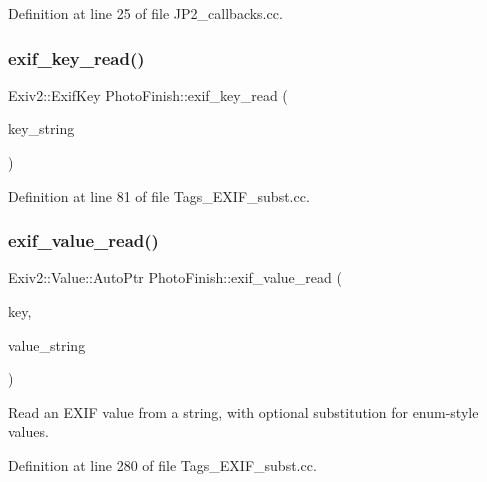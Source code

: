 Definition at line 25 of file J\+P2\+\_\+callbacks.\+cc.

\mbox{\label{namespace_photo_finish_a0b89b01a1b60b5e7c02fa92d001d9872}} 
\subsubsection{\texorpdfstring{exif\+\_\+key\+\_\+read()}{exif\_key\_read()}}
{\footnotesize\ttfamily Exiv2\+::\+Exif\+Key Photo\+Finish\+::exif\+\_\+key\+\_\+read (\begin{DoxyParamCaption}\item[{std\+::string}]{key\+\_\+string }\end{DoxyParamCaption})}



Definition at line 81 of file Tags\+\_\+\+E\+X\+I\+F\+\_\+subst.\+cc.

\mbox{\label{namespace_photo_finish_a26b48907e51881629189963d62678563}} 
\subsubsection{\texorpdfstring{exif\+\_\+value\+\_\+read()}{exif\_value\_read()}}
{\footnotesize\ttfamily Exiv2\+::\+Value\+::\+Auto\+Ptr Photo\+Finish\+::exif\+\_\+value\+\_\+read (\begin{DoxyParamCaption}\item[{Exiv2\+::\+Exif\+Key}]{key,  }\item[{std\+::string}]{value\+\_\+string }\end{DoxyParamCaption})}



Read an E\+X\+IF value from a string, with optional substitution for enum-\/style values. 



Definition at line 280 of file Tags\+\_\+\+E\+X\+I\+F\+\_\+subst.\+cc.

\mbox{\label{namespace_photo_finish_aabc75ddd4dcb561448e15c30b0efa906}} 

